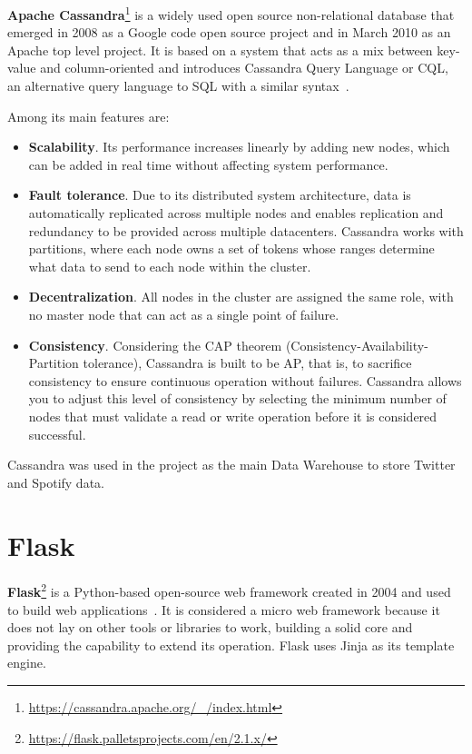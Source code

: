 \nonzeroparskip \textbf{Apache Cassandra}\footnote{\url{https://cassandra.apache.org/_/index.html}} is a widely used open source non-relational database that emerged in 2008 as a Google code open source project and in March 2010 as an Apache top level project. It is based on a system that acts as a mix between key-value and column-oriented and introduces Cassandra Query Language or CQL, an alternative query language to SQL with a similar syntax~\cite{cassandra,wikipedia_cassandra}.

\nonzeroparskip Among its main features are:
\begin{itemize}
	\item \textbf{Scalability}. Its performance increases linearly by adding new nodes, which can be added in real time without affecting system performance.
	\item \textbf{Fault tolerance}. Due to its distributed system architecture, data is automatically replicated across multiple nodes and enables replication and redundancy to be provided across multiple datacenters. Cassandra works with partitions, where each node owns a set of tokens whose ranges determine what data to send to each node within the cluster.
	\item \textbf{Decentralization}. All nodes in the cluster are assigned the same role, with no master node that can act as a single point of failure.
	\item \textbf{Consistency}. Considering the CAP theorem (Consistency-Availability-Partition tolerance), Cassandra is built to be AP, that is, to sacrifice consistency to ensure continuous operation without failures. Cassandra allows you to adjust this level of consistency by selecting the minimum number of nodes that must validate a read or write operation before it is considered successful.
\end{itemize}

\nonzeroparskip Cassandra was used in the project as the main Data Warehouse to store Twitter and Spotify data.

\section{Flask}

\nonzeroparskip \textbf{Flask}\footnote{\url{https://flask.palletsprojects.com/en/2.1.x/}} is a Python-based open-source web framework created in 2004 and used to build web applications~\cite{flask}. It is considered a micro web framework because it does not lay on other tools or libraries to work, building a solid core and providing the capability to extend its operation. Flask uses Jinja as its template engine.

